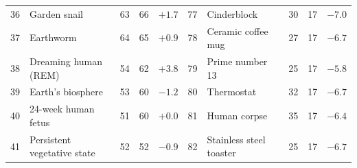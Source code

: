 \documentclass[10pt,twocolumn]{article}
\begin{document}
\begin{table}[t]
{\begin{tabular}{rlrrr|rlrrr}
36 & Garden snail & 63 & 66 & $+1.7$ & 77 & Cinderblock & 30 & 17 & $-7.0$ \\
37 & Earthworm & 64 & 65 & $+0.9$ & 78 & Ceramic coffee mug & 27 & 17 & $-6.7$ \\
38 & Dreaming human (REM) & 54 & 62 & $+3.8$ & 79 & Prime number 13 & 25 & 17 & $-5.8$ \\
39 & Earth's biosphere & 53 & 60 & $-1.2$ & 80 & Thermostat & 32 & 17 & $-6.7$ \\
40 & 24-week human fetus & 51 & 60 & $+0.0$ & 81 & Human corpse & 35 & 17 & $-6.4$ \\
41 & Persistent vegetative state & 52 & 52 & $-0.9$ & 82 & Stainless steel toaster & 25 & 17 & $-6.7$ \\
\bottomrule
\end{tabular}}
\end{table}



\end{document}
